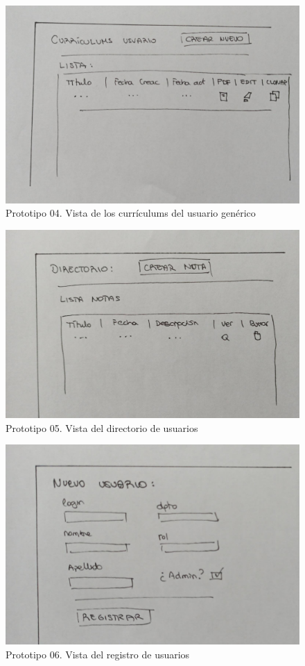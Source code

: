 \begin{figure}
    \centering
    \includegraphics[width=\linewidth]{img/PT04-CVUser.jpeg}
    \caption{Prototipo 04. Vista de los currículums del usuario genérico}   
\end{figure}

\begin{figure}
    \centering
    \includegraphics[width=\linewidth]{img/PT05-Directorio.jpeg}
    \caption{Prototipo 05. Vista del directorio de usuarios}
\end{figure}

\begin{figure}
    \centering
    \includegraphics[width=\linewidth]{img/PT06-Register.jpeg}
    \caption{Prototipo 06. Vista del registro de usuarios}   
\end{figure}


